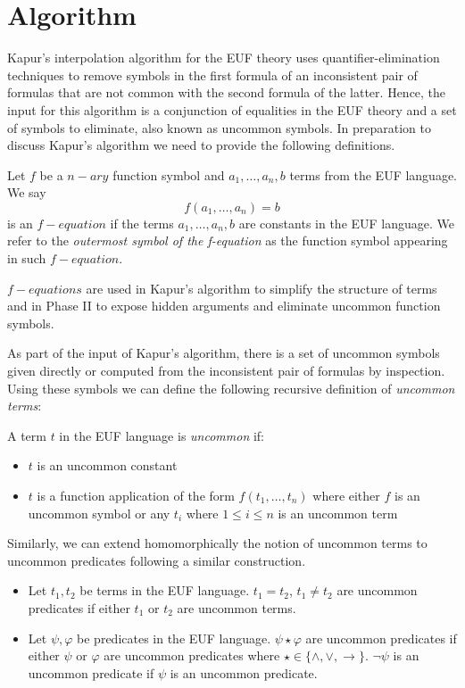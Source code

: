 \section{Algorithm}

Kapur's interpolation algorithm for the EUF theory uses quantifier-elimination
techniques to remove symbols in the first formula of an inconsistent pair of formulas
that are not common with the second formula of the latter. 
Hence, the input for this algorithm is a conjunction of equalities in the
EUF theory and a set of symbols to eliminate, also known as uncommon symbols.
In preparation to discuss Kapur's algorithm we need to provide the 
following definitions.

\begin{definition} 
  Let $f$ be a $n-ary$ function symbol and $a_1, \dots, a_n,
  b$ terms from the EUF language. We say 
  \begin{equation*}
    f(a_1, \dots, a_n) = b
  \end{equation*}
  is an $f-equation$ if the terms $a_1, \dots, a_n, b$ are constants in
  the EUF language. We refer to the \emph{outermost symbol of the f-equation}
  as the function symbol appearing in such $f-equation$.
\end{definition}

$f-equations$ are used in Kapur's algorithm to simplify the structure of terms 
and in Phase II to expose hidden arguments and eliminate uncommon function symbols.

As part of the input of Kapur's algorithm, there is a set of uncommon symbols given 
directly or computed from the inconsistent pair of formulas by inspection. Using
these symbols we can define the following recursive definition of \emph{uncommon terms}:

\begin{definition}
  A term $t$ in the EUF language is \emph{uncommon} if:
  \begin{itemize}
    \item $t$ is an uncommon constant
    \item $t$ is a function application of the form $f(t_1, \dots, t_n)$
      where either $f$ is an uncommon symbol or any $t_i$ where $1 \leq i \leq n$ 
      is an uncommon term
  \end{itemize}

  Similarly, we can extend homomorphically the notion of uncommon terms to uncommon 
  predicates following a similar construction.

  \begin{itemize}
    \item Let $t_1, t_2$ be terms in the EUF language. $t_1 = t_2$,
      $t_1 \neq t_2$ are uncommon predicates if either $t_1$ or $t_2$
      are uncommon terms.
    \item Let $\psi, \varphi$ be predicates in the EUF language. 
      $\psi \star \varphi$ are uncommon predicates if either $\psi$
      or $\varphi$ are uncommon predicates where $\star \in \{ \land,
      \lor, \rightarrow \}$. $\neg \psi$ is an uncommon predicate if $\psi$
      is an uncommon predicate.

  \end{itemize}
\end{definition}



